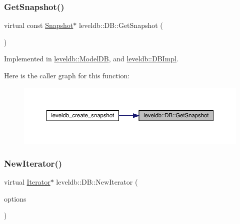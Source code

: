 \subsubsection{\texorpdfstring{GetSnapshot()}{GetSnapshot()}}
{\footnotesize\ttfamily virtual const \mbox{\hyperlink{classleveldb_1_1_snapshot}{Snapshot}}$\ast$ leveldb\+::\+D\+B\+::\+Get\+Snapshot (\begin{DoxyParamCaption}{ }\end{DoxyParamCaption})\hspace{0.3cm}{\ttfamily [pure virtual]}}



Implemented in \mbox{\hyperlink{classleveldb_1_1_model_d_b_aa82849af6a149d122e65a4aac412903f}{leveldb\+::\+Model\+DB}}, and \mbox{\hyperlink{classleveldb_1_1_d_b_impl_a4bec3d8ffd65fec562b2dd1f6eaba137}{leveldb\+::\+D\+B\+Impl}}.

Here is the caller graph for this function\+:
\nopagebreak
\begin{figure}[H]
\begin{center}
\leavevmode
\includegraphics[width=350pt]{classleveldb_1_1_d_b_a7d13f6336c7c5f0bf79578d57c45568c_icgraph}
\end{center}
\end{figure}
\mbox{\label{classleveldb_1_1_d_b_a5629308235de24c05c286c353d4e7d32}} 
\subsubsection{\texorpdfstring{NewIterator()}{NewIterator()}}
{\footnotesize\ttfamily virtual \mbox{\hyperlink{classleveldb_1_1_iterator}{Iterator}}$\ast$ leveldb\+::\+D\+B\+::\+New\+Iterator (\begin{DoxyParamCaption}\item[{const \mbox{\hyperlink{structleveldb_1_1_read_options}{Read\+Options}} \&}]{options }\end{DoxyParamCaption})\hspace{0.3cm}{\ttfamily [pure virtual]}}



